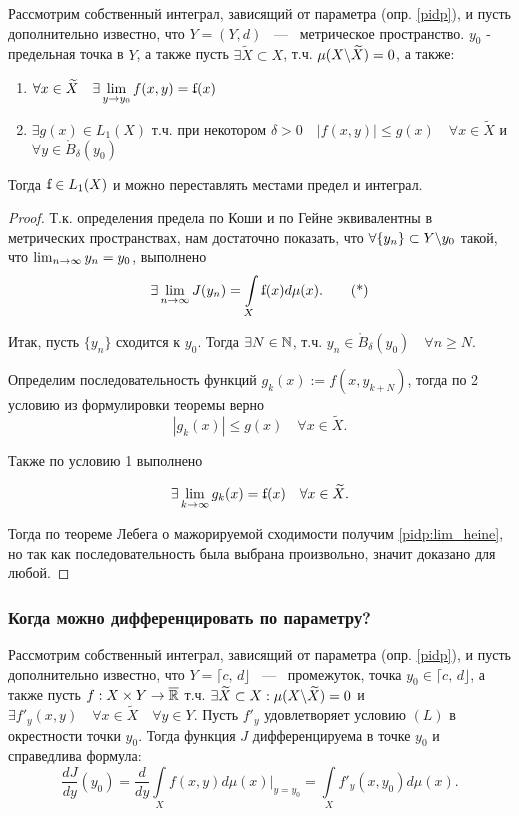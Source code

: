 \theorem Рассмотрим собственный интеграл, зависящий от параметра (опр. \ref{pidp}), и пусть дополнительно известно, что $Y = (Y, d)$ ~---~ метрическое пространство. $y_0$ - предельная точка в $Y$, а также пусть $\exists \widetilde{X} \subset X$, т.ч. $\mu(X \backslash \widetilde{X}) = 0$, а также:
\begin{enumerate}
    \item $\forall x \in \widetilde{X} \quad \exists \lim\limits_{y \ra y_0} f(x, y) = \ff(x)$
    \item $\exists g(x) \in L_1(X)$ т.ч. при некотором $\delta > 0 \quad \left| f(x,y)\right| \leq g(x) \quad \forall x \in \widetilde{X}$ и $\forall y \in \mathring{B}_\delta(y_0)$
\end{enumerate}


Тогда $\ff \in L_1(X)$ и можно переставлять местами предел и интеграл. 

\begin{proof}
	Т.к. определения предела по Коши и по Гейне эквивалентны в метрических пространствах, нам достаточно показать, что $\forall \{y_n\} \subset Y \backslash y_0$ такой, что $\lim_{n \rightarrow \infty} y_n = y_0$, выполнено \[
	\exists \lim\limits_{n \ra \infty} J(y_n) = \int\limits_{X} \ff(x) d\mu(x). \tag{*}
	\label{pidp:lim_heine}
	\]
	
	Итак, пусть $\{y_n\}$ сходится к $y_0$. Тогда $\exists N \in \mathbb{N}$, т.ч. $y_n \in \mathring{B}_\delta(y_0) \quad \forall n \geq N$.
	
	Определим последовательность функций $g_k(x) := f(x, y_{k + N})$, тогда по 2 условию из формулировки теоремы верно
	$$\left| g_k(x) \right| \leq g(x) \quad \forall x \in \widetilde{X}.$$
	
	Также по условию 1 выполнено
	
	$$\exists \lim\limits_{k \ra \infty}g_k(x) = \ff(x) \quad \forall x \in \widetilde{X}.$$
	
	Тогда по теореме Лебега о мажорируемой сходимости получим \eqref{pidp:lim_heine}, но так как последовательность была выбрана произвольно, значит доказано для любой.
\end{proof}

\subsubsection{Когда можно дифференцировать по параметру?}

\theorem Рассмотрим собственный интеграл, зависящий от параметра (опр. \ref{pidp}), и пусть дополнительно известно, что $Y = \lceil c, \, d\rfloor$ ~---~ промежуток, точка $y_0 \in \lceil c, \, d\rfloor$, а также пусть $f : X \times Y \rightarrow \overline{\mathbb{R}}$ т.ч. $\exists \widetilde{X} \subset X : \mu(X \backslash \widetilde{X}) = 0$ и $\exists f'_y(x, y) \quad \forall x \in \widetilde{X} \quad \forall y \in Y$. Пусть $f'_y$ удовлетворяет условию $(L)$ в окрестности точки $y_0$. Тогда функция $J$ дифференцируема в точке $y_0$ и справедлива формула:
$$\frac{d J}{d y}(y_0) = \frac{d}{d y} \int\limits_X f(x, y) d \mu(x) \Bigg|_{y=y_0} = \int\limits_X f'_y(x, y_0) d \mu(x).$$


